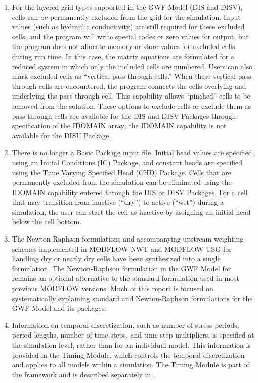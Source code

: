 \begin{enumerate}
\item For the layered grid types supported in the GWF Model (DIS and DISV), cells can be permanently excluded from the grid for the simulation.  Input values (such as hydraulic conductivity) are still required for these excluded cells, and the program will write special codes or zero values for output, but the program does not allocate memory or store values for excluded cells during run time.  In this case, the matrix equations are formulated for a reduced system in which only the included cells are numbered.  Users can also mark excluded cells as ``vertical pass-through cells.''  When these vertical pass-through cells are encountered, the program connects the cells overlying and underlying the pass-through cell.  This capability allows ``pinched'' cells to be removed from the solution.  These options to exclude cells or exclude them as pass-through cells are available for the DIS and DISV Packages through specification of the IDOMAIN array; the IDOMAIN capability is not available for the DISU Package.

\item There is no longer a Basic Package input file.  Initial head values are specified using an Initial Conditions (IC) Package, and constant heads are specified using the Time Varying Specified Head (CHD) Package.  Cells that are permanently excluded from the simulation can be eliminated using the IDOMAIN capability entered through the DIS or DISV Packages.  For a cell that may transition from inactive (``dry'') to active (``wet'') during a simulation, the user can start the cell as inactive by assigning an initial head below the cell bottom.

\item The Newton-Raphson formulations and accompanying upstream weighting schemes implemented in MODFLOW-NWT and MODFLOW-USG for handling dry or nearly dry cells have been synthesized into a single formulation.  The Newton-Raphson formulation in the GWF Model for \mf remains an optional alternative to the standard formulation used in most previous MODFLOW versions. Much of this report is focused on systematically explaining standard and Newton-Raphson formulations for the GWF Model and its packages.

\item Information on temporal discretization, such as number of stress periods, period lengths, number of time steps, and time step multipliers, is specified at the simulation level, rather than for an individual model.  This information is provided in the Timing Module, which controls the temporal discretization and applies to all models within a simulation.  The Timing Module is part of the \mf framework and is described separately in \cite{modflow6framework}.


\end{enumerate}
